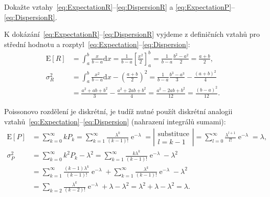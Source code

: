 \documentclass[a4paper,11pt,twoside]{article}
\DeclareMathOperator{\e}{e}
\renewcommand{\d}{\mathrm{d}}
\def\expectation#1{\mathrm{E}\left[#1\right]}
\def\dispersion#1{\sigma_{#1}^{2}}
\theoremstyle{red}
\theoremstyle{green}
\begin{document}
    \begin{voluntary}
        Dokažte vztahy~\eqref{eq:ExpectationR}--\eqref{eq:DispersionR} a \eqref{eq:ExpectationP}--\eqref{eq:DispersionR}.
    \end{voluntary}

    \begin{solution}
        K dokázání~\eqref{eq:ExpectationR}--\eqref{eq:DispersionR} vyjdeme z definičních vztahů pro střední hodnotu a rozptyl~\eqref{eq:Expectation}--\eqref{eq:Dispersion}:
        \begin{align}
            \expectation{R}
                &=\int_{a}^{b}\frac{x}{b-a}\d x
                =\frac{1}{b-a}\left[\frac{x^{2}}{2}\right]_{a}^{b}
                =\frac{1}{b-a}\frac{b^{2}-a^{2}}{2}
                =\frac{a+b}{2},\\
            \dispersion{R}
                &=\int_{a}^{b}\frac{x^{2}}{b-a}\d x-\left(\frac{a+b}{2}\right)^{2}
                =\frac{1}{b-a}\frac{b^{3}-a^{3}}{3}-\frac{(a+b)^{2}}{4}\nonumber\\
                &=\frac{a^{2}+ab+b^{2}}{3}-\frac{a^{2}+2ab+b^{2}}{4}
                =\frac{a^{2}-2ab+b^{2}}{12}=\frac{(b-a)^{2}}{12}.
        \end{align}

        Poissonovo rozdělení je diskrétní, je tudíž nutné použít diskrétní analogii vztahů~\eqref{eq:Expectation}--\eqref{eq:Dispersion} (nahrazení integrálů sumami):
        \begin{align}
            \expectation{P}
                &=\sum_{k=0}^{\infty}kP_{k}
                =\sum_{k=1}^{\infty}\frac{\lambda^{k}}{(k-1)!}\e^{-\lambda}
                =\left|\begin{array}{c}\text{substituce} \\ l=k-1\end{array}\right|
                =\sum_{l=0}^{\infty}\frac{\lambda^{l+1}}{l!}\e^{-\lambda}=\lambda,\\
            \dispersion{P}
                &=\sum_{k=0}^{\infty}k^{2}P_{k}-\lambda^{2}
                =\sum_{k=1}^{\infty}\frac{k\lambda^{k}}{(k-1)!}\e^{-\lambda}-\lambda^{2}\nonumber\\
                &=\sum_{k=1}^{\infty}\frac{(k-1)\lambda^{k}}{(k-1)!}\e^{-\lambda}+\sum_{k=1}^{\infty}\frac{\lambda^{k}}{(k-1)!}\e^{-\lambda}-\lambda^{2}\nonumber\\
                &=\sum_{k=2}\frac{\lambda^{k}}{(k-2)!}\e^{-\lambda}+\lambda-\lambda^{2}
                =\lambda^{2}+\lambda-\lambda^{2}=\lambda.
        \end{align}
    \end{solution}
\end{document}
